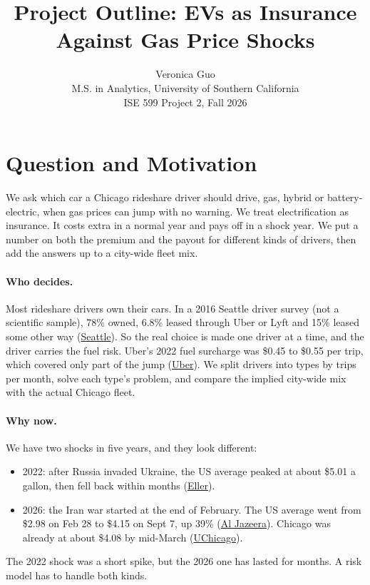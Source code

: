 \documentclass[11pt]{article}
\title{Project Outline: EVs as Insurance Against Gas Price Shocks}
\author{Veronica Guo\\
\small M.S. in Analytics, University of Southern California\\
\small ISE 599 Project 2, Fall 2026}
\date{}
\begin{document}
\maketitle
\vspace{-1.5em}

\section{Question and Motivation}

We ask which car a Chicago rideshare driver should drive, gas, hybrid or battery-electric, when gas prices can jump with no warning. We treat electrification as insurance. It costs extra in a normal year and pays off in a shock year. We put a number on both the premium and the payout for different kinds of drivers, then add the answers up to a city-wide fleet mix.

\paragraph{Who decides.} Most rideshare drivers own their cars. In a 2016 Seattle driver survey (not a scientific sample), 78\% owned, 6.8\% leased through Uber or Lyft and 15\% leased some other way (\href{https://seattle.gov/Documents/Departments/FAS/RegulatoryServices/collective-bargaining/for-hire-driver-survey-summary.pdf}{Seattle}). So the real choice is made one driver at a time, and the driver carries the fuel risk. Uber's 2022 fuel surcharge was \$0.45 to \$0.55 per trip, which covered only part of the jump (\href{https://www.uber.com/us/en/newsroom/new-fuel-surcharge}{Uber}). We split drivers into types by trips per month, solve each type's problem, and compare the implied city-wide mix with the actual Chicago fleet.

\paragraph{Why now.} We have two shocks in five years, and they look different:
\begin{itemize}
  \item 2022: after Russia invaded Ukraine, the US average peaked at about \$5.01 a gallon, then fell back within months (\href{https://forecast.eller.arizona.edu/news/hormuz-crisis-and-gasoline-prices-how-does-2026-compare}{Eller}).
  \item 2026: the Iran war started at the end of February. The US average went from \$2.98 on Feb 28 to \$4.15 on Sept 7, up 39\% (\href{https://www.aljazeera.com/economy/2026/9/7/oil-prices-surge-as-us-iran-strikes-intensify-in-strait-of-hormuz}{Al Jazeera}). Chicago was already at about \$4.08 by mid-March (\href{https://climate.uchicago.edu/news/as-gas-prices-in-chicago-rise-due-to-iran-war-commuters-face-mounting-costs/}{UChicago}).
\end{itemize}
The 2022 shock was a short spike, but the 2026 one has lasted for months. A risk model has to handle both kinds.
\end{document}
